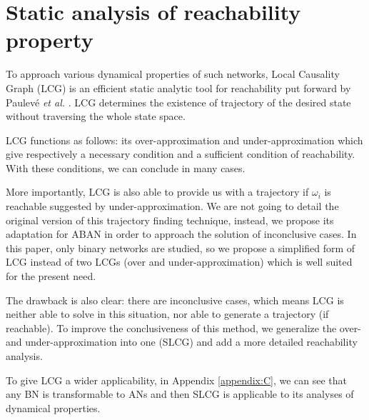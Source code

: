 \documentclass[runningheads]{llncs}
\begin{document}
\section{Static analysis of reachability property}\label{sect:3}
To approach various dynamical properties of such networks, Local Causality Graph (LCG) is an efficient static analytic tool for reachability put forward by Paulev\'e \textit{et al.} \cite{pauleve2011}. 
LCG determines the existence of trajectory of the desired state without traversing the whole state space.

LCG functions as follows: its over-approximation and under-approximation which give respectively a necessary condition and a sufficient condition of reachability. 
With these conditions, we can conclude in many cases.%


More importantly, LCG is also able to provide us with a trajectory if $\omega_i$ is reachable suggested by under-approximation.
We are not going to detail the original version of this trajectory finding technique, instead, we propose its adaptation for ABAN in order to approach the solution of inconclusive cases.
In this paper, only binary networks are studied, so we propose a simplified form of LCG instead of two LCGs (over and under-approximation) which is well suited for the present need.

The drawback is also clear: there are inconclusive cases, which means LCG is neither able to solve in this situation, nor able to generate a trajectory (if reachable).
To improve the conclusiveness of this method, we generalize the over- and under-approximation into one (SLCG) and add a more detailed reachability analysis.

To give LCG a wider applicability, in Appendix \ref{appendix:C}, we can see that any BN is transformable to ANs and then SLCG is applicable to its analyses of dynamical properties.
\end{document}
